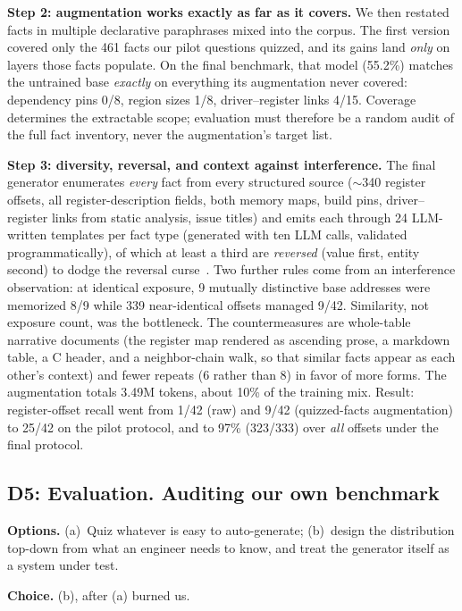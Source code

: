 \textbf{Step 2: augmentation works exactly as far as it covers.} We then
restated facts in multiple declarative paraphrases mixed into the corpus. The
first version covered only the 461 facts our pilot questions quizzed, and its
gains land \emph{only} on layers those facts populate. On the final benchmark,
that model (55.2\%) matches the untrained base \emph{exactly} on everything
its augmentation never covered: dependency pins 0/8, region sizes 1/8,
driver--register links 4/15. Coverage determines the extractable scope;
evaluation must therefore be a random audit of the full fact inventory, never
the augmentation's target list.

\textbf{Step 3: diversity, reversal, and context against interference.} The
final generator enumerates \emph{every} fact from every structured source
($\sim$340 register offsets, all register-description fields, both memory
maps, build pins, driver--register links from static analysis, issue titles)
and emits each through 24 LLM-written templates per fact type (generated with ten LLM calls,
validated programmatically), of which at least a third are
\emph{reversed} (value first, entity second) to dodge the reversal
curse~\citep{berglund2023reversal}. Two further rules come from an
interference observation: at identical exposure, 9 mutually distinctive base
addresses were memorized 8/9 while 339 near-identical offsets managed 9/42.
Similarity, not exposure count, was the bottleneck. The countermeasures are
whole-table narrative documents (the register map rendered as ascending prose,
a markdown table, a C header, and a neighbor-chain walk, so that similar facts
appear as each other's context) and fewer repeats (6 rather than 8) in favor
of more forms. The augmentation totals 3.49M tokens, about 10\% of the
training mix. Result: register-offset recall went from 1/42 (raw) and 9/42
(quizzed-facts augmentation) to 25/42 on the pilot protocol, and to 97\%
(323/333) over \emph{all} offsets under the final protocol.

\subsection{D5: Evaluation. Auditing our own benchmark}
\label{sec:d5}

\textbf{Options.} (a)~Quiz whatever is easy to auto-generate; (b)~design the
distribution top-down from what an engineer needs to know, and treat the
generator itself as a system under test.

\textbf{Choice.} (b), after (a) burned us.

